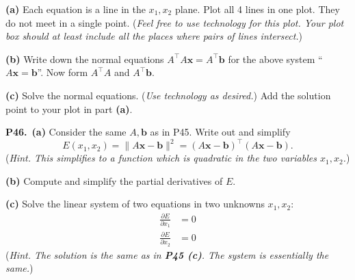 \documentclass[12pt]{amsart}
\newcommand{\bb}{\bm{b}}
\newcommand{\bx}{\bm{x}}
\newcommand{\prob}[1]{\bigskip\noindent\textbf{#1.}\quad }
\newcommand{\epart}[1]{\medskip\noindent\textbf{(#1)}\quad }
\newcommand{\ppart}[1]{\,\textbf{(#1)}\quad }
\begin{document}
\epart{a} Each equation is a line in the $x_1,x_2$ plane.  Plot all 4 lines in one plot.  They do not meet in a single point.  (\emph{Feel free to use technology for this plot.  Your plot box should at least include all the places where pairs of lines intersect.})

\epart{b} Write down the normal equations $A^\top A \bx = A^\top \bb$ for the above system ``$A\bx = \bb$''.  Now form $A^\top A$ and $A^\top \bb$.

\epart{c} Solve the normal equations.  (\emph{Use technology as desired.})  Add the solution point to your plot in part \textbf{(a)}.


\prob{P46}  \ppart{a}  Consider the same $A,\bb$ as in P45.  Write out and simplify
    $$E(x_1,x_2) = \|A\bx - \bb\|^2 = (A\bx - \bb)^\top (A\bx - \bb).$$
(\emph{Hint.  This simplifies to a function which is quadratic in the two variables $x_1,x_2$.})

\epart{b}  Compute and simplify the partial derivatives of $E$.

\epart{c}  Solve the linear system of two equations in two unknowns $x_1,x_2$:
\begin{align*}
\frac{\partial E}{\partial x_1} &= 0 \\
\frac{\partial E}{\partial x_2} &= 0
\end{align*}
(\emph{Hint.  The solution is the same as in \textbf{P45 (c)}.  The system is essentially the same.})
\end{document}
